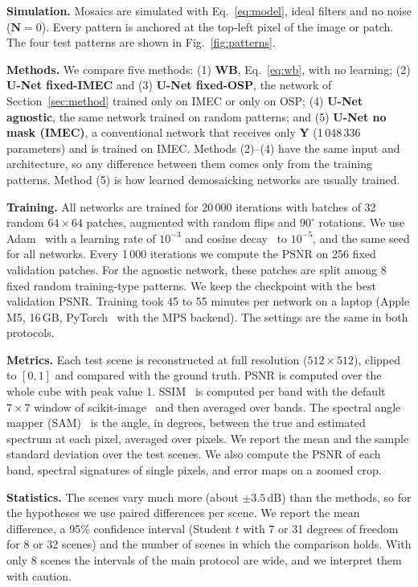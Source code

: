 \documentclass{article}
\def\Y{{\mathbf Y}}
\def\N{{\mathbf N}}
\begin{document}
\textbf{Simulation.} Mosaics are simulated with Eq.~\eqref{eq:model}, ideal
filters and no noise ($\N=0$). Every pattern is anchored at the top-left
pixel of the image or patch. The four test patterns are shown in
Fig.~\ref{fig:patterns}.

\textbf{Methods.} We compare five methods: (1) \textbf{WB},
Eq.~\eqref{eq:wb}, with no learning; (2) \textbf{U-Net fixed-IMEC} and
(3) \textbf{U-Net fixed-OSP}, the network of Section~\ref{sec:method}
trained only on IMEC or only on OSP; (4) \textbf{U-Net agnostic}, the same
network trained on random patterns; and (5) \textbf{U-Net no mask (IMEC)}, a
conventional network that receives only $\Y$ (1\,048\,336 parameters) and is
trained on IMEC. Methods (2)--(4) have the same input and architecture, so
any difference between them comes only from the training patterns. Method (5)
is how learned demosaicking networks are usually trained.

\textbf{Training.} All networks are trained for 20\,000 iterations with
batches of 32 random $64\times64$ patches, augmented with random flips and
$90^\circ$ rotations. We use Adam~\cite{kingma2015} with a learning rate of
$10^{-3}$ and cosine decay~\cite{loshchilov2017} to $10^{-5}$, and the same
seed for all networks. Every 1\,000 iterations we compute the PSNR on 256
fixed validation patches. For the agnostic network, these patches are split
among 8 fixed random training-type patterns. We keep the checkpoint with the
best validation PSNR. Training took 45 to 55 minutes per network on a laptop
(Apple M5, 16\,GB, PyTorch~\cite{paszke2019} with the MPS backend). The
settings are the same in both protocols.

\textbf{Metrics.} Each test scene is reconstructed at full resolution
($512\times512$), clipped to $[0,1]$ and compared with the ground truth. PSNR
is computed over the whole cube with peak value 1. SSIM~\cite{wang2004} is
computed per band with the default $7\times7$ window of
scikit-image~\cite{vanderwalt2014} and then averaged over bands. The spectral
angle mapper (SAM)~\cite{kruse1993} is the angle, in degrees, between the
true and estimated spectrum at each pixel, averaged over pixels. We report
the mean and the sample standard deviation over the test scenes. We also
compute the PSNR of each band, spectral signatures of single pixels, and
error maps on a zoomed crop.

\textbf{Statistics.} The scenes vary much more (about $\pm3.5$\,dB) than the
methods, so for the hypotheses we use paired differences per scene. We
report the mean difference, a 95\% confidence interval (Student $t$ with 7
or 31 degrees of freedom for 8 or 32 scenes) and the number of scenes in
which the comparison holds. With only 8 scenes the intervals of the main
protocol are wide, and we interpret them with caution.
\end{document}
